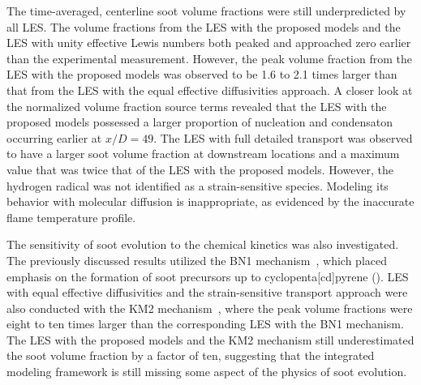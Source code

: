 The time-averaged, centerline soot volume fractions were still underpredicted by all LES. The volume fractions from the LES with the proposed models and the LES with unity effective Lewis numbers both peaked and approached zero earlier than the experimental measurement. However, the peak volume fraction from the LES with the proposed models was observed to be 1.6 to 2.1 times larger than that from the LES with the equal effective diffusivities approach. A closer look at the normalized volume fraction source terms revealed that the LES with the proposed models possessed a larger proportion of nucleation and condensaton occurring earlier at $x/D = 49$. The LES with full detailed transport was observed to have a larger soot volume fraction at downstream locations and a maximum value that was twice that of the LES with the proposed models. However, the hydrogen radical was not identified as a strain-sensitive species. Modeling its behavior with molecular diffusion is inappropriate, as evidenced by the inaccurate flame temperature profile. %

The sensitivity of soot evolution to the chemical kinetics was also investigated. The previously discussed results utilized the BN1 mechanism~\cite{blanquart2009,narayanaswamy2010}, which placed emphasis on the formation of soot precursors up to cyclopenta[cd]pyrene (). LES with equal effective diffusivities and the strain-sensitive transport approach were also conducted with the KM2 mechanism~\cite{wang2013}, where the peak volume fractions were eight to ten times larger than the corresponding LES with the BN1 mechanism. The LES with the proposed models and the KM2 mechanism still underestimated the soot volume fraction by a factor of ten, suggesting that the integrated modeling framework is still missing some aspect of the physics of soot evolution.

